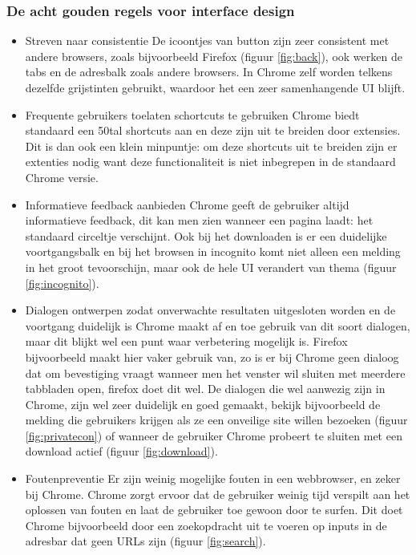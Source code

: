 \documentclass[12pt]{article}
\begin{document}
\subsubsection{De acht gouden regels voor interface design}
\begin{itemize}
	\item Streven naar consistentie
	\newline
	De icoontjes van button zijn zeer consistent met andere browsers, zoals bijvoorbeeld Firefox (figuur \ref{fig:back}), ook werken de tabs en de adresbalk zoals andere browsers. In Chrome zelf worden telkens dezelfde grijstinten gebruikt, waardoor het een zeer samenhangende UI blijft.
	\item Frequente gebruikers toelaten schortcuts te gebruiken
	\newline
	Chrome biedt standaard een 50tal shortcuts aan\cite{shortcuts} en deze zijn uit te breiden door extensies. Dit is dan ook een klein minpuntje: om deze shortcuts uit te breiden zijn er extenties nodig want deze functionaliteit is niet inbegrepen in de standaard Chrome versie.
	\item Informatieve feedback aanbieden
	\newline
	Chrome geeft de gebruiker altijd informatieve feedback, dit kan men zien wanneer een pagina laadt: het standaard circeltje verschijnt. Ook bij het downloaden is er een duidelijke voortgangsbalk en bij het browsen in incognito komt niet alleen een melding in het groot tevoorschijn, maar ook de hele UI verandert van thema (figuur \ref{fig:incognito}).
	\item Dialogen ontwerpen zodat onverwachte resultaten uitgesloten worden en de voortgang duidelijk is
	\newline
	Chrome maakt af en toe gebruik van dit soort dialogen, maar dit blijkt wel een punt waar verbetering mogelijk is. Firefox bijvoorbeeld maakt hier vaker gebruik van, zo is er bij Chrome geen dialoog dat om bevestiging vraagt wanneer men het venster wil sluiten met meerdere tabbladen open, firefox doet dit wel. De dialogen die wel aanwezig zijn in Chrome, zijn wel zeer duidelijk en goed gemaakt, bekijk bijvoorbeeld de melding die gebruikers krijgen als ze een onveilige site willen bezoeken (figuur \ref{fig:privatecon}) of wanneer de gebruiker Chrome probeert te sluiten met een download actief (figuur \ref{fig:download}).
	\item Foutenpreventie
	\newline
	Er zijn weinig mogelijke fouten in een webbrowser, en zeker bij Chrome. Chrome zorgt ervoor dat de gebruiker weinig tijd verspilt aan het oplossen van fouten en laat de gebruiker toe gewoon door te surfen. Dit doet Chrome bijvoorbeeld door een zoekopdracht uit te voeren op inputs in de adresbar dat geen URLs zijn (figuur \ref{fig:search}).

\end{itemize}
\end{document}
